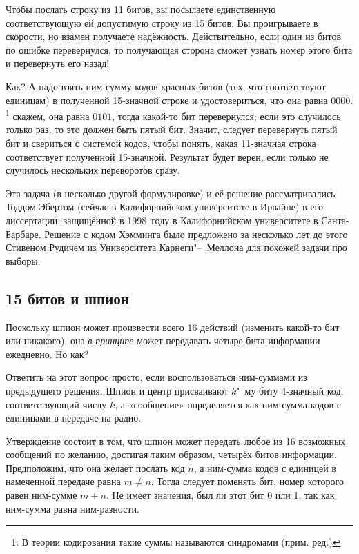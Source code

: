 \documentclass[twoside]{book}
\begin{document}
Чтобы послать строку из 11 битов, вы посылаете единственную соответствующую ей допустимую строку из 15 битов.
Вы проигрываете в скорости, но взамен получаете надёжность.
Действительно, если один из битов по ошибке перевернулся, то получающая сторона сможет узнать номер этого бита и перевернуть его назад!

Как? А надо взять ним-сумму кодов красных битов (тех, что соответствуют единицам) в полученной 15-значной строке и удостовериться, что она равна $0000$. \footnote{В теории кодирования такие суммы называются синдромами (прим. ред.)}
 скажем, она равна $0101$,
тогда какой-то бит перевернулся;
если это случилось только раз, то это должен быть пятый бит.
Значит, следует перевернуть пятый бит и свериться с системой кодов, чтобы понять, какая 11-значная строка соответствует полученной 15-значной.
Результат будет верен, если только не случилось нескольких переворотов сразу.

\medskip

Эта задача (в несколько другой формулировке) и её решение рассматривались Тоддом Эбертом (сейчас в Калифорнийском университете в Ирвайне) в его диссертации, защищённой в 1998~году в Калифорнийском университете в Санта-Барбаре.
Решение с кодом Хэмминга было предложено за несколько лет до этого Стивеном Рудичем из Университета Карнеги"--~Меллона  для похожей задачи про выборы.

\subsection*{15 битов и шпион}

Поскольку шпион может произвести всего 16 действий (изменить какой-то бит или никакого),  она \emph{в принципе} может передавать четыре бита информации ежедневно.
Но как?

Ответить на этот вопрос просто, если воспользоваться ним-суммами из предыдущего решения.
Шпион и  центр присваивают $k$"~му биту 4-значный код, соответствующий числу $k$, а «сообщение» определяется как ним-сумма кодов с единицами в передаче на радио.

Утверждение состоит в том, что шпион может передать любое из 16 возможных сообщений по  желанию,
достигая таким образом, четырёх битов информации.
Предположим, что она желает послать код $n$, а ним-сумма кодов с единицей в намеченной передаче равна $m\ne n$.
Тогда  следует поменять бит, номер которого равен ним-сумме $m+n$.
Не имеет значения, был ли этот бит 0 или 1, так как ним-сумма равна ним-разности.
\heart
\end{document}
